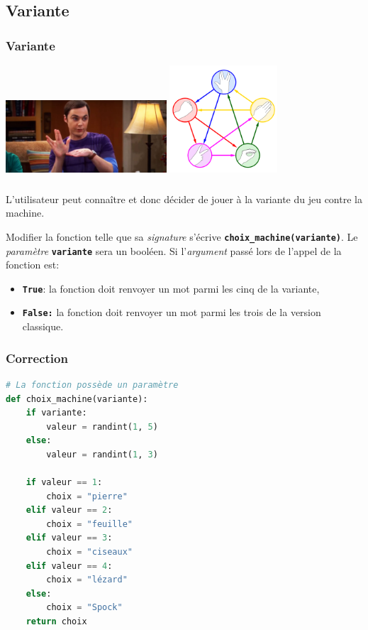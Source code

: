 \documentclass[svgnames,11pt]{beamer}
\begin{document}
\subsection{Variante}
\begin{frame}
    \frametitle{Variante}

\begin{center}
\centering
\includegraphics[width=6cm]{ressources/sheldon.jpg}
\includegraphics[width=4cm]{ressources/pfcls.png}
\end{center}
\end{frame}
\begin{frame}
    \frametitle{}

L'utilisateur peut connaître et donc décider de jouer à la variante du jeu contre la machine.
\begin{activite}
Modifier la fonction telle que sa \emph{signature} s'écrive \textbf{\texttt{choix\_machine(variante)}}. Le \emph{paramètre} \textbf{\texttt{variante}} sera un booléen. Si l'\emph{argument} passé lors de l'appel de la fonction est:
\begin{itemize}
    \item \textbf{\texttt{True}}: la fonction doit renvoyer un mot parmi les cinq de la variante,
    \item \textbf{\texttt{False:}} la fonction doit renvoyer un mot parmi les trois de la version classique.
\end{itemize}
\end{activite}

\end{frame}
\begin{frame}[fragile]
    \frametitle{Correction}
\begin{lstlisting}[language=Python , basicstyle=\ttfamily\small, xleftmargin=2em, xrightmargin=2em]
# La fonction possède un paramètre
def choix_machine(variante):
    if variante:
        valeur = randint(1, 5)        
    else:
        valeur = randint(1, 3)
        
    if valeur == 1:
        choix = "pierre"
    elif valeur == 2:
        choix = "feuille"
    elif valeur == 3:
        choix = "ciseaux"
    elif valeur == 4:
        choix = "lézard"
    else:
        choix = "Spock"
    return choix
\end{lstlisting}
\end{frame}
\end{document}
